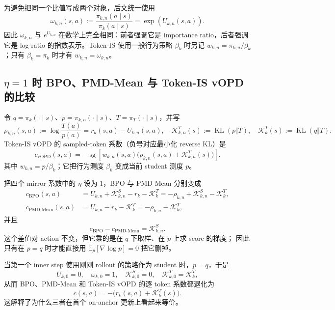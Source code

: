 为避免把同一个比值写成两个对象，后文统一使用
\begin{equation}
\label{eq:ch2-omega-exp-u}
\omega_{k,n}(s,a)
:=\frac{\pi_{k,n}(a\mid s)}{\pi_k(a\mid s)}
=\exp\!\left(U_{k,n}(s,a)\right).
\end{equation}
因此 $\omega_{k,n}$ 与 $e^{U_{k,n}}$ 在数学上完全相同：前者强调它是
importance ratio，后者强调它是 log-ratio 的指数表示。Token-IS 使用一般行为策略
$\beta_k$ 时另记 $w_{k,n}=\pi_{k,n}/\beta_k$；只有 $\beta_k=\pi_k$ 时才有
$w_{k,n}=\omega_{k,n}$。

\subsection{$\eta=1$ 时 BPO、PMD-Mean 与 Token-IS vOPD 的比较}
\label{subsec:ch2-opd-eta-one-vopd}

令 $q=\pi_k(\cdot\mid s)$、$p=\pi_{k,n}(\cdot\mid s)$、$T=\pi_T(\cdot\mid s)$，并写
\begin{equation}
\rho_{k,n}(s,a):=\log\frac{T(a)}{p(a)}=r_k(s,a)-U_{k,n}(s,a),
\quad
\mathcal K_{k,n}^{T}(s):=\operatorname{KL}(p\Vert T),
\quad
\mathcal K_k^{T}(s):=\operatorname{KL}(q\Vert T).
\end{equation}
Token-IS vOPD 的 sampled-token 系数（负号对应最小化 reverse KL）是
\begin{equation}
\label{eq:ch2-vopd-token-is-coef}
c_{\mathrm{vOPD}}(s,a)
=-\operatorname{sg}\!\left[
w_{k,n}(s,a)\bigl(\rho_{k,n}(s,a)+\mathcal K_{k,n}^{T}(s)\bigr)
\right].
\end{equation}
其中 $w_{k,n}=p/\beta_k$；它把行为测度 $\beta_k$ 变成当前 student 测度 $p$。

把四个 mirror 系数中的 $\eta$ 设为 $1$，BPO 与 PMD-Mean 分别变成
\begin{align}
c_{\mathrm{BPO}}(s,a)
&=U_{k,n}+\mathcal K_{k,n}^{S}-r_k-\mathcal K_k^{T}
 =-\rho_{k,n}+\mathcal K_{k,n}^{S}-\mathcal K_k^{T},
\label{eq:ch2-bpo-eta-one}\\
c_{\mathrm{PMD\text{-}Mean}}(s,a)
&=U_{k,n}-r_k-\mathcal K_k^{T}
 =-\rho_{k,n}-\mathcal K_k^{T},
\label{eq:ch2-pmd-mean-eta-one}
\end{align}
并且
\begin{equation}
c_{\mathrm{BPO}}-c_{\mathrm{PMD\text{-}Mean}}=\mathcal K_{k,n}^{S}.
\end{equation}
这个差值对 action 不变，但它乘的是在 $q$ 下取样、在 $p$ 上求 score 的梯度；
因此只有在 $p=q$ 时才能直接用 $\mathbb E_p[\nabla\log p]=0$ 把它删掉。

当第一个 inner step 使用刚刚 rollout 的策略作为 student 时，$p=q$，于是
\begin{equation}
U_{k,0}=0,\quad \omega_{k,0}=1,\quad
\mathcal K_{k,0}^{S}=0,\quad \mathcal K_{k,0}^{T}=\mathcal K_k^{T},
\end{equation}
从而 BPO、PMD-Mean 和 Token-IS vOPD 的逐 token 系数都退化为
\begin{equation}
c(s,a)=-\bigl(r_k(s,a)+\mathcal K_k^{T}(s)\bigr).
\end{equation}
这解释了为什么三者在首个 on-anchor 更新上看起来等价。

